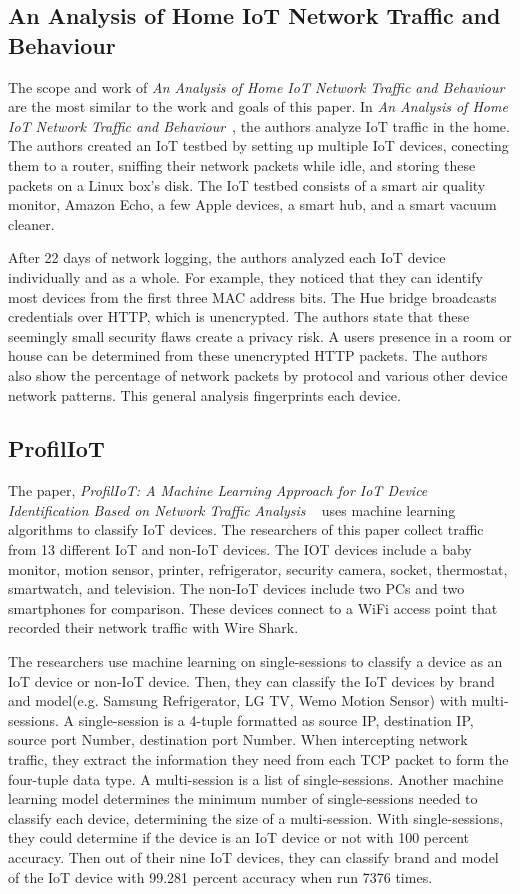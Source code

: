 \subsection{An Analysis of Home IoT Network Traffic and Behaviour}
The scope and work of \textit{An Analysis of Home IoT Network Traffic and Behaviour}~\cite{home_iot} are the most similar to the work and goals of this paper. In \textit{An Analysis of Home IoT Network Traffic and Behaviour}~\cite{home_iot}, the authors analyze IoT traffic in the home. The authors created an IoT testbed by setting up multiple IoT devices, conecting them to a router, sniffing their network packets while idle, and storing these packets on a Linux box's disk. The IoT testbed consists of a smart air quality monitor, Amazon Echo, a few Apple devices, a smart hub, and a smart vacuum cleaner.

After 22 days of network logging, the authors analyzed each IoT device individually and as a whole. For example, they noticed that they can identify most devices from the first three MAC address bits. The Hue bridge broadcasts credentials over HTTP, which is unencrypted. The authors state that these seemingly small security flaws create a privacy risk. A users presence in a room or house can be determined from these unencrypted HTTP packets. The authors also show the percentage of network packets by protocol and various other device network patterns. This general analysis fingerprints each device.

\subsection{ProfilIoT}
The paper, \textit{ProfilIoT: A Machine Learning Approach for IoT Device Identification Based on Network Traffic Analysis} ~\cite{Meidan:2017:PML:3019612.3019878} uses machine learning algorithms to classify IoT devices. The researchers of this paper collect traffic from 13 different IoT and non-IoT devices. The IOT devices include a baby monitor, motion sensor, printer, refrigerator, security camera, socket, thermostat, smartwatch, and television. The non-IoT devices include two PCs and two smartphones for comparison. These devices connect to a WiFi access point that recorded their network traffic with Wire Shark\cite{wireshark}.

The researchers use machine learning on single-sessions to classify a device as an IoT device or non-IoT device. Then, they can classify the IoT devices by brand and model(e.g. Samsung Refrigerator, LG TV, Wemo Motion Sensor) with multi-sessions. A single-session is a 4-tuple formatted as source IP, destination IP, source port Number, destination port Number. When intercepting network traffic, they extract the information they need from each TCP packet to form the four-tuple data type. A multi-session is a list of single-sessions. Another machine learning model determines the minimum number of single-sessions needed to classify each device, determining the size of a multi-session. With single-sessions, they could determine if the device is an IoT device or not with 100 percent accuracy. Then out of their nine IoT devices, they can classify brand and model of the IoT device with 99.281 percent accuracy when run 7376 times.

